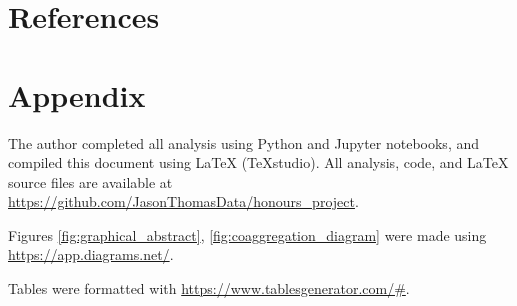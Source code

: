 \documentclass{article}
\begin{document}
\newpage

\section{References}
\printbibliography[heading=none]

\newpage

\section{Appendix}

The author completed all analysis using Python and Jupyter notebooks, and compiled this document using LaTeX (TeXstudio). All analysis, code, and LaTeX source files are available at \url{https://github.com/JasonThomasData/honours_project}.

Figures \ref{fig:graphical_abstract}, \ref{fig:coaggregation_diagram} were made using \url{https://app.diagrams.net/}.

Tables were formatted with \url{https://www.tablesgenerator.com/#}.
\end{document}
